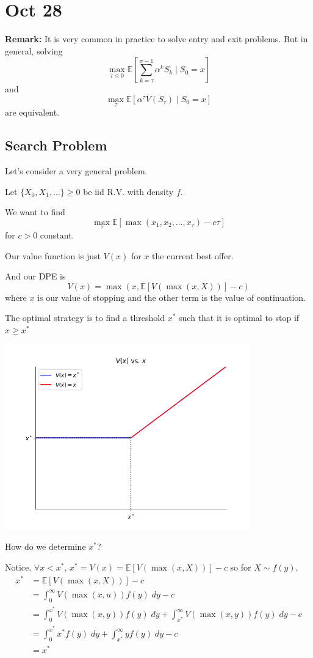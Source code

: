 \documentclass[12pt]{report}
\newcommand{\E}{\mathbb{E}}
\newcommand*{\tbf}[1]{\ifmmode\mathbf{#1}\else\textbf{#1}\fi}
\begin{document}
\section*{Oct 28}
    \tbf{Remark:} It is very common in practice to solve entry and exit problems. But in general, solving
    \[\max_{\tau \leq 0} \E\left[\sum_{k=\tau}^{\sigma - 1} \alpha^k S_k \; | \; S_0 = x\right]\]
    and 
    \[\max_{\tau} \E\left[\alpha^{\tau} V(S_{\tau}) \; | \; S_0 = x\right]\]
    are equivalent. 

\subsection*{Search Problem}
    Let's consider a very general problem. 
    
    Let $\{X_0, X_1, \dots\} \geq 0$ be iid R.V. with density $f$. 

    We want to find 
    \[\max_{\tau} \E[\max(x_1, x_2, \dots, x_{\tau}) - c\tau]\]
    for $c > 0$ constant. 

    Our value function is just $V(x)$ for $x$ the current best offer. 

    And our DPE is
    \[V(x) = \max\left(x, \E[V(\max(x, X))] - c\right)\]
    where $x$ is our value of stopping and the other term is the value of continuation. 

    The optimal strategy is to find a threshold $x^*$ such that it is optimal to stop if $x \geq x^*$

    \begin{center}
        \includegraphics[width=0.8\textwidth]{Images/x_star search.png}
    \end{center}

    How do we determine $x^*$? 

    Notice, $\forall x < x^*$, $x^* = V(x) = \E[V(\max(x, X))] - c$ so for $X \sim f(y)$,
    \begin{align*}
        x^* &= \E[V(\max(x, X))] - c\\ 
            &= \int_0^{\infty} V(\max(x, u)) f(y)\; dy - c\\ 
            &= \int_0^{x^*} V(\max(x, y)) f(y)\; dy + \int_{x^*}^{\infty} V(\max(x, y)) f(y)\; dy - c\\ 
            &= \int_0^{x^*} x^* f(y)\; dy + \int_{x^*}^{\infty} y f(y)\; dy - c\\
            &= x^*
    \end{align*}
\end{document}
